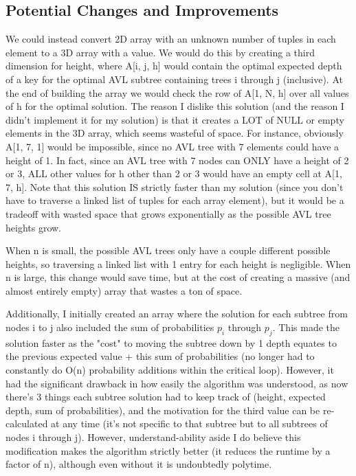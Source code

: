 \documentclass[a4paper]{article}
\begin{document}
\subsection{Potential Changes and Improvements}
We could instead convert 2D array with an unknown number of tuples in each element to a 3D array with a value. We would do this by creating a third dimension for height, where A[i, j, h] would contain the optimal expected depth of a key for the optimal AVL subtree containing trees i through j (inclusive). At the end of building the array we would check the row of A[1, N, h] over all values of h for the optimal solution. The reason I dislike this solution (and the reason I didn't implement it for my solution) is that it creates a LOT of NULL or empty elements in the 3D array, which seems wasteful of space. For instance, obviously A[1, 7, 1] would be impossible, since no AVL tree with 7 elements could have a height of 1. In fact, since an AVL tree with 7 nodes can ONLY have a height of 2 or 3, ALL other values for h other than 2 or 3 would have an empty cell at A[1, 7, h]. 
Note that this solution IS strictly faster than my solution (since you don't have to traverse a linked list of tuples for each array element), but it would be a tradeoff with wasted space that grows exponentially as the possible AVL tree heights grow.

When n is small, the possible AVL trees only have a couple different possible heights, so traversing a linked list with 1 entry for each height is negligible. When n is large, this change would save time, but at the cost of creating a massive (and almost entirely empty) array that wastes a ton of space.

Additionally, I initially created an array where the solution for each subtree from nodes i to j also included the sum of probabilities $p_i$ through $p_j$. This made the solution faster as the "cost" to moving the subtree down by 1 depth equates to the previous expected value + this sum of probabilities (no longer had to constantly do O(n) probability additions within the critical loop). However, it had the significant drawback in how easily the algorithm was understood, as now there's 3 things each subtree solution had to keep track of (height, expected depth, sum of probabilities), and the motivation for the third value can be re-calculated at any time (it's not specific to that subtree but to all subtrees of nodes i through j). However, understand-ability aside I do believe this modification makes the algorithm strictly better (it reduces the runtime by a factor of n), although even without it is undoubtedly polytime.
\end{document}
